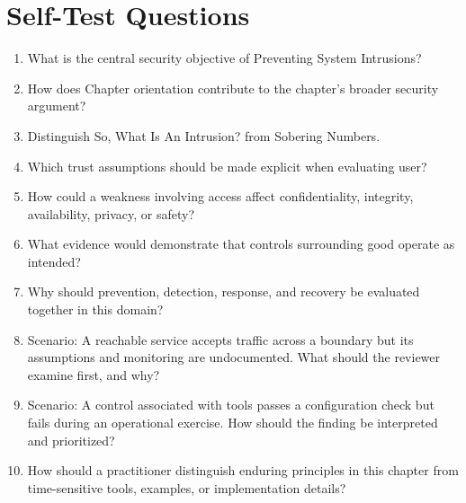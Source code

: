 \documentclass[11pt]{article}
\begin{document}
\section*{Self-Test Questions}
\begin{enumerate}
\item What is the central security objective of Preventing System Intrusions?
\item How does Chapter orientation contribute to the chapter's broader security argument?
\item Distinguish So, What Is An Intrusion? from Sobering Numbers.
\item Which trust assumptions should be made explicit when evaluating user?
\item How could a weakness involving access affect confidentiality, integrity, availability, privacy, or safety?
\item What evidence would demonstrate that controls surrounding good operate as intended?
\item Why should prevention, detection, response, and recovery be evaluated together in this domain?
\item Scenario: A reachable service accepts traffic across a boundary but its assumptions and monitoring are undocumented. What should the reviewer examine first, and why?
\item Scenario: A control associated with tools passes a configuration check but fails during an operational exercise. How should the finding be interpreted and prioritized?
\item How should a practitioner distinguish enduring principles in this chapter from time-sensitive tools, examples, or implementation details?
\end{enumerate}
\end{document}
